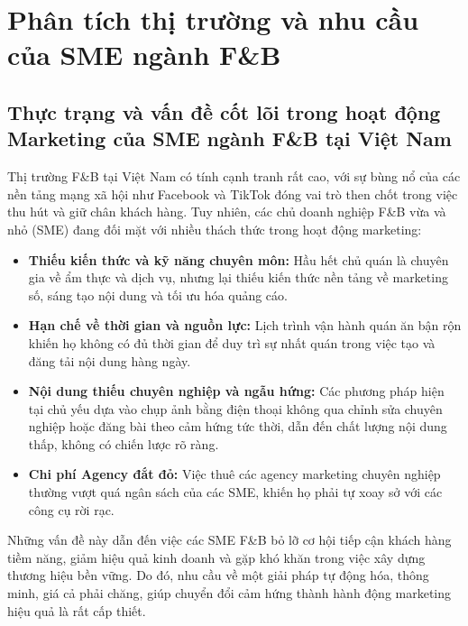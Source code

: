 \chapter{Phân tích thị trường và nhu cầu của SME ngành F\&B}\label{tuxecm-hiux1ec3u-vuxe0-nghiuxean-cux1ee9u}

\section{Thực trạng và vấn đề cốt lõi trong hoạt động Marketing của
SME ngành F\&B tại Việt
Nam}\label{thux1ef1c-trux1ea1ng-vuxe0-vux1ea5n-ux111ux1ec1-cux1ed1t-luxf5i-trong-houx1ea1t-ux111ux1ed9ng-marketing-cux1ee7a-sme-nguxe0nh-fb-tux1ea1i-viux1ec7t-nam}

Thị trường F\&B tại Việt Nam có tính cạnh tranh rất cao, với sự bùng nổ
của các nền tảng mạng xã hội như Facebook và TikTok đóng vai trò then
chốt trong việc thu hút và giữ chân khách hàng. Tuy nhiên, các chủ doanh
nghiệp F\&B vừa và nhỏ (SME) đang đối mặt với nhiều thách thức trong
hoạt động marketing:

\begin{itemize}
\item
  \textbf{Thiếu kiến thức và kỹ năng chuyên môn:} Hầu hết chủ quán là
  chuyên gia về ẩm thực và dịch vụ, nhưng lại thiếu kiến thức nền tảng
  về marketing số, sáng tạo nội dung và tối ưu hóa quảng cáo.
\item
  \textbf{Hạn chế về thời gian và nguồn lực:} Lịch trình vận hành quán
  ăn bận rộn khiến họ không có đủ thời gian để duy trì sự nhất quán
  trong việc tạo và đăng tải nội dung hàng ngày.
\item
  \textbf{Nội dung thiếu chuyên nghiệp và ngẫu hứng:} Các phương pháp
  hiện tại chủ yếu dựa vào chụp ảnh bằng điện thoại không qua chỉnh sửa
  chuyên nghiệp hoặc đăng bài theo cảm hứng tức thời, dẫn đến chất lượng
  nội dung thấp, không có chiến lược rõ ràng.
\item
  \textbf{Chi phí Agency đắt đỏ:} Việc thuê các agency marketing chuyên
  nghiệp thường vượt quá ngân sách của các SME, khiến họ phải tự xoay sở
  với các công cụ rời rạc.
\end{itemize}

Những vấn đề này dẫn đến việc các SME F\&B bỏ lỡ cơ hội tiếp cận khách
hàng tiềm năng, giảm hiệu quả kinh doanh và gặp khó khăn trong việc xây
dựng thương hiệu bền vững. Do đó, nhu cầu về một giải pháp tự động hóa,
thông minh, giá cả phải chăng, giúp chuyển đổi cảm hứng thành hành động
marketing hiệu quả là rất cấp thiết.

